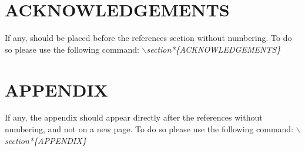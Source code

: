 \documentclass[a4paper,10pt]{article}
\begin{document}
\section*{\uppercase{Acknowledgements}}

\noindent If any, should be placed before the references section
without numbering. To do so please use the following command:
\textit{$\backslash$section*\{ACKNOWLEDGEMENTS\}}


\vfill

{\small
}


\section*{\uppercase{Appendix}}

\noindent If any, the appendix should appear directly after the
references without numbering, and not on a new page. To do so please use the following command:
\textit{$\backslash$section*\{APPENDIX\}}

\vfill
\end{document}
